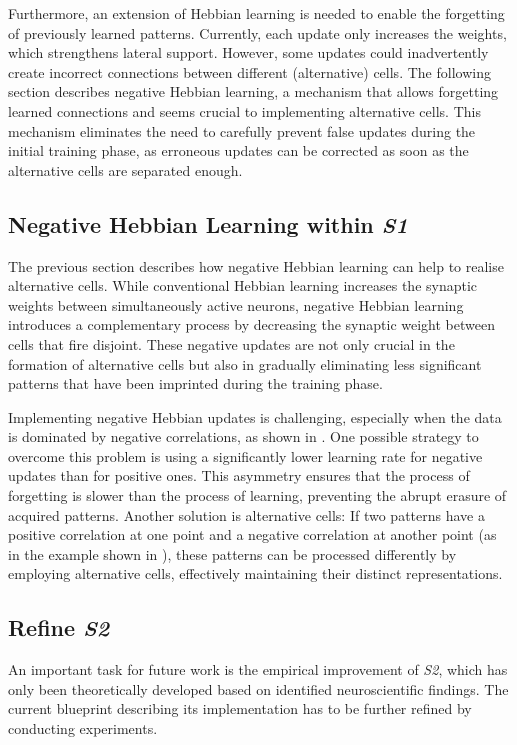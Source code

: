 Furthermore, an extension of Hebbian learning is needed to enable the forgetting of previously learned patterns.
Currently, each update only increases the weights, which strengthens lateral support.
However, some updates could inadvertently create incorrect connections between different (alternative) cells.
The following section describes negative Hebbian learning, a mechanism that allows forgetting learned connections and seems crucial to implementing alternative cells.
This mechanism eliminates the need to carefully prevent false updates during the initial training phase, as erroneous updates can be corrected as soon as the alternative cells are separated enough.

\subsection{Negative Hebbian Learning within \emph{S1}}
The previous section describes how negative Hebbian learning can help to realise alternative cells.
While conventional Hebbian learning increases the synaptic weights between simultaneously active neurons, negative Hebbian learning introduces a complementary process by decreasing the synaptic weight between cells that fire disjoint.
These negative updates are not only crucial in the formation of alternative cells but also in gradually eliminating less significant patterns that have been imprinted during the training phase.

Implementing negative Hebbian updates is challenging, especially when the data is dominated by negative correlations, as shown in .
One possible strategy to overcome this problem is using a significantly lower learning rate for negative updates than for positive ones.
This asymmetry ensures that the process of forgetting is slower than the process of learning, preventing the abrupt erasure of acquired patterns.
Another solution is alternative cells: If two patterns have a positive correlation at one point and a negative correlation at another point (as in the example shown in ), these patterns can be processed differently by employing alternative cells, effectively maintaining their distinct representations.


\subsection{Refine \emph{S2}}
An important task for future work is the empirical improvement of \emph{S2}, which has only been theoretically developed based on identified neuroscientific findings. The current blueprint describing its implementation has to be further refined by conducting experiments.

